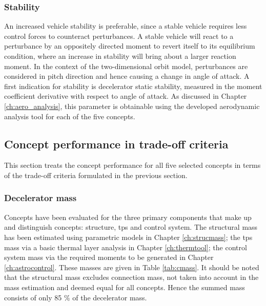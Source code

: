 \subsubsection{Stability}
An increased vehicle stability is preferable, since a stable vehicle requires less control forces to counteract perturbances. A stable vehicle will react to a perturbance by an oppositely directed moment to revert itself to its equilibrium condition, where an increase in stability will bring about a larger reaction moment. In the context of the two-dimensional orbit model, perturbances are considered in pitch direction and hence causing a change in angle of attack. A first indication for stability is decelerator static stability, measured in the moment coefficient derivative with respect to angle of attack. As discussed in Chapter \ref{ch:aero_analysis}, this parameter is obtainable using the developed aerodynamic analysis tool for each of the five concepts.

\subsection{Concept performance in trade-off criteria}
This section treats the concept performance for all five selected concepts in terms of the trade-off criteria formulated in the previous section.

\subsubsection{Decelerator mass}
Concepts have been evaluated for the three primary components that make up and distinguish concepts: structure, \acrfull{tps} and control system. The structural mass has been estimated using parametric models in Chapter \ref{ch:strucmass}; the \gls{tps} mass via a basic thermal layer analysis in Chapter \ref{ch:thermtool}; the control system mass via the required moments to be generated in Chapter \ref{ch:astrocontrol}.  These masses are given in Table \ref{tab:cmass}. It should be noted that the structural mass excludes connection mass, not taken into account in the mass estimation and deemed equal for all concepts. Hence the summed mass consists of only 85 $\%$ of the decelerator mass.

